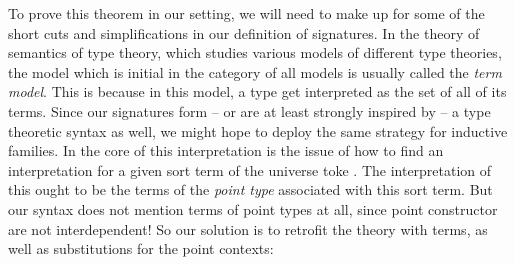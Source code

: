 To prove this theorem in our setting, we will need to make up for some of the
short cuts and simplifications in our definition of signatures.
In the theory of semantics of type theory, which studies various models of different
type theories, the model which is initial in the category of all models
is usually called the \emph{term model}.
This is because in this model, a type get interpreted as the set of all of its
terms.
Since our signatures form -- or are at least strongly
inspired by -- a type theoretic syntax as well, we might hope to deploy the same
strategy for inductive families.
In the core of this interpretation is the issue of how to find an interpretation
for a given sort term  of the universe toke \tqm{\UU}.
The interpretation of this ought to be the terms of the \emph{point type}
 associated with this sort term.
But our syntax does not mention terms of point types at all, since point constructor
are not interdependent!
So our solution is to retrofit the theory with terms, as well as substitutions
for the point contexts:

